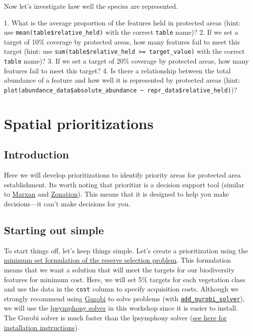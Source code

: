 \documentclass[12pt,]{book}
\makeatletter
\newenvironment{kframe}{%
\medskip{}
\setlength{\fboxsep}{.8em}
 \def\at@end@of@kframe{}%
 \ifinner\ifhmode%
  \def\at@end@of@kframe{\end{minipage}}%
  \begin{minipage}{\columnwidth}%
 \fi\fi%
 \def\FrameCommand##1{\hskip\@totalleftmargin \hskip-\fboxsep
 \colorbox{shadecolor}{##1}\hskip-\fboxsep
     \hskip-\linewidth \hskip-\@totalleftmargin \hskip\columnwidth}%
 \MakeFramed {\advance\hsize-\width
   \@totalleftmargin\z@ \linewidth\hsize
   \@setminipage}}%
 {\par\unskip\endMakeFramed%
 \at@end@of@kframe}
\newenvironment{rmdblock}[1]
  {
  \begin{itemize}
  \renewcommand{\labelitemi}{
    \raisebox{-.7\height}[0pt][0pt]{
      {\setkeys{Gin}{width=3em,keepaspectratio}\texttt{[image: images/\#1]}}
    }
  }
  \setlength{\fboxsep}{1em}
  \begin{kframe}
  \item
  }
  {
  \end{kframe}
  \end{itemize}
  }
\newenvironment{rmdquestion}
  {\begin{rmdblock}{question}}
  {\end{rmdblock}}
\makeatother
\begin{document}
Now let's investigate how well the species are represented.

\begin{rmdquestion} 1. What is the average proportion of the
features held in protected areas (hint: use
\texttt{mean(table\$relative\_held)} with the correct \texttt{table}
name)? 2. If we set a target of 10\% coverage by protected areas, how
many features fail to meet this target (hint: use
\texttt{sum(table\$relative\_held\ \textgreater{}=\ target\_value)} with
the correct \texttt{table} name)? 3. If we set a target of 20\% coverage
by protected areas, how many features fail to meet this target? 4. Is
there a relationship between the total abundance of a feature and how
well it is represented by protected areas (hint:
\texttt{plot(abundance\_data\$absolute\_abundance\ \textasciitilde{}\ repr\_data\$relative\_held)})?
\end{rmdquestion}

\chapter{Spatial prioritizations}\label{spatial-prioritizations}

\section{Introduction}\label{introduction}

Here we will develop prioritizations to identify priority areas for
protected area establishment. Its worth noting that prioritizr is a
decision support tool (similar to \href{http://marxan.org/}{Marxan} and
\href{https://www.helsinki.fi/en/researchgroups/digital-geography-lab/software-developed-in-cbig\#section-52992}{Zonation}).
This means that it is designed to help you make decisions---it can't
make decisions for you.

\section{Starting out simple}\label{starting-out-simple}

To start things off, let's keep things simple. Let's create a
prioritization using the
\href{https://prioritizr.net/reference/add_min_set_objective.html}{minimum
set formulation of the reserve selection problem}. This formulation
means that we want a solution that will meet the targets for our
biodiversity features for minimum cost. Here, we will set 5\% targets
for each vegetation class and use the data in the \texttt{cost} column
to specify acquisition costs. Although we strongly recommend using
\href{https://www.gurobi.com/}{Gurobi} to solve problems (with
\href{https://prioritizr.net/reference/add_gurobi_solver.html}{\texttt{add\_gurobi\_solver}}),
we will use the
\href{https://prioritizr.net/reference/add_lpsymphony_solver.html}{lpsymphony
solver} in this workshop since it is easier to install. The Gurobi
solver is much faster than the lpsymphony solver
(\href{https://prioritizr.net/articles/gurobi_installation.html}{see
here for installation instructions}).
\end{document}
